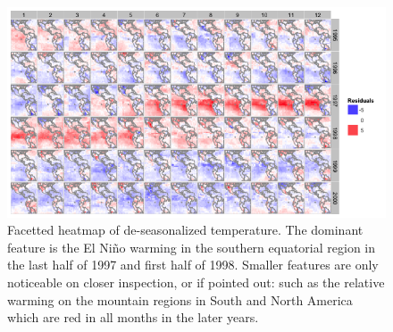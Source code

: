 \documentclass[oneside]{article}
\begin{document}
\begin{figure}[htbp]
  \centering
  \includegraphics[width=5.5in]{nasa-colored-map.png}
  \caption{Facetted heatmap of de-seasonalized temperature. The dominant feature is the El Ni\~no warming in the southern equatorial region in the last half of 1997 and first half of 1998. Smaller features are only noticeable on closer inspection, or if pointed out: such as the relative warming on the mountain regions in South and North America which are red in all months in the later years.}
  \label{fig:nasa-facet}
\end{figure}
\end{document}
